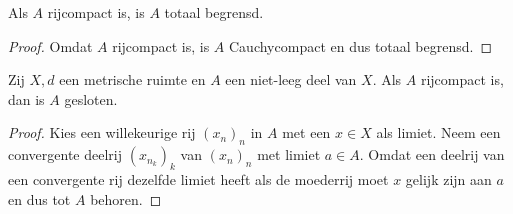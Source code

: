 \documentclass[main.tex]{subfiles}
\begin{document}
\begin{pr}
  \label{pr:rijcompact-dan-totaal-begrensd}
  Als $A$ rijcompact is, is $A$ totaal begrensd.

  \begin{proof}
    Omdat $A$ rijcompact is, is $A$ Cauchycompact  en dus totaal begrensd.
  \end{proof}
\end{pr}

\begin{bst}
  Zij $X,d$ een metrische ruimte en $A$ een niet-leeg deel van $X$.
  Als $A$ rijcompact is, dan is $A$ gesloten.
  \begin{proof}
      Kies een willekeurige rij $(x_{n})_{n}$ in $A$ met een $x\in X$ als limiet.
      Neem een convergente deelrij $(x_{n_{k}})_{k}$ van $(x_{n})_{n}$ met limiet $a\in A$.
      Omdat een deelrij van een convergente rij dezelfde limiet heeft als de moederrij moet $x$ gelijk zijn aan $a$ en dus tot $A$ behoren.
  \end{proof}
\end{bst}
\end{document}
